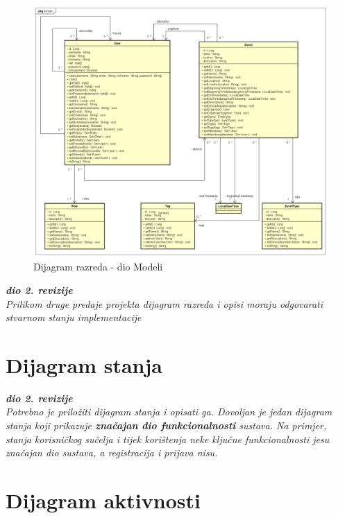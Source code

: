 			\begin{figure}[h]
				\includegraphics[width=\textwidth]{dijagrami/UML modeli.png}
				\caption{Dijagram razreda - dio Modeli}
			\end{figure}
		
			\eject
		
			\iffalse
			
				\textbf{\textit{dio 2. revizije}}\\			
			
				\textit{Prilikom druge predaje projekta dijagram razreda i opisi moraju odgovarati stvarnom stanju implementacije}
			
			
			
				\eject
		
			\section{Dijagram stanja}
			
			
				\textbf{\textit{dio 2. revizije}}\\
			
				\textit{Potrebno je priložiti dijagram stanja i opisati ga. Dovoljan je jedan dijagram stanja koji prikazuje \textbf{značajan dio funkcionalnosti} sustava. Na primjer, stanja korisničkog sučelja i tijek korištenja neke ključne funkcionalnosti jesu značajan dio sustava, a registracija i prijava nisu. }
			
			
				\eject 
		
			\section{Dijagram aktivnosti}
			
